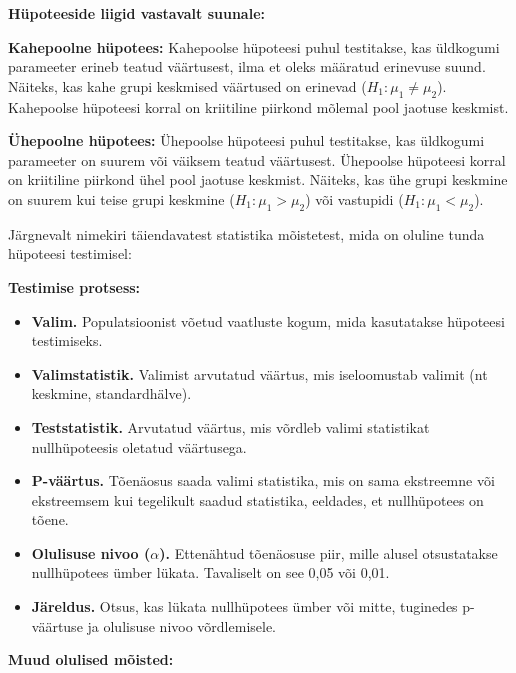 \documentclass[
]{book}
\providecommand{\tightlist}{%
  \setlength{\itemsep}{0pt}\setlength{\parskip}{0pt}}
\theoremstyle{definition}
\theoremstyle{definition}
\theoremstyle{definition}
\theoremstyle{definition}
\theoremstyle{remark}
\begin{document}
\textbf{Hüpoteeside liigid vastavalt suunale:}

\textbf{Kahepoolne hüpotees:} Kahepoolse hüpoteesi puhul testitakse, kas üldkogumi parameeter erineb teatud väärtusest, ilma et oleks määratud erinevuse suund. Näiteks, kas kahe grupi keskmised väärtused on erinevad (\(H_1: \mu_1 \neq \mu_2\)). Kahepoolse hüpoteesi korral on kriitiline piirkond mõlemal pool jaotuse keskmist.

\textbf{Ühepoolne hüpotees:} Ühepoolse hüpoteesi puhul testitakse, kas üldkogumi parameeter on suurem või väiksem teatud väärtusest. Ühepoolse hüpoteesi korral on kriitiline piirkond ühel pool jaotuse keskmist. Näiteks, kas ühe grupi keskmine on suurem kui teise grupi keskmine (\(H_1: \mu_1 > \mu_2\)) või vastupidi (\(H_1: \mu_1 < \mu_2\)).

Järgnevalt nimekiri täiendavatest statistika mõistetest, mida on oluline tunda hüpoteesi testimisel:

\textbf{Testimise protsess:}

\begin{itemize}
\tightlist
\item
  \textbf{Valim.} Populatsioonist võetud vaatluste kogum, mida kasutatakse hüpoteesi testimiseks.
\item
  \textbf{Valimstatistik.} Valimist arvutatud väärtus, mis iseloomustab valimit (nt keskmine, standardhälve).
\item
  \textbf{Teststatistik.} Arvutatud väärtus, mis võrdleb valimi statistikat nullhüpoteesis oletatud väärtusega.
\item
  \textbf{P-väärtus.} Tõenäosus saada valimi statistika, mis on sama ekstreemne või ekstreemsem kui tegelikult saadud statistika, eeldades, et nullhüpotees on tõene.
\item
  \textbf{Olulisuse nivoo (\(\alpha\)).} Ettenähtud tõenäosuse piir, mille alusel otsustatakse nullhüpotees ümber lükata. Tavaliselt on see 0,05 või 0,01.
\item
  \textbf{Järeldus.} Otsus, kas lükata nullhüpotees ümber või mitte, tuginedes p-väärtuse ja olulisuse nivoo võrdlemisele.
\end{itemize}

\textbf{Muud olulised mõisted:}
\end{document}
